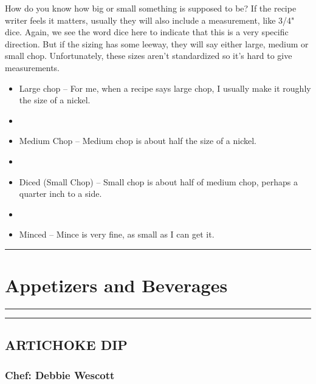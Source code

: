 \documentclass[
]{book}
\begin{document}
How do you know how big or small something is supposed to be? If the recipe writer feels it matters,
usually they will also include a measurement, like 3/4" dice.
Again, we see the word dice here to indicate that this is a very specific direction.
But if the sizing has some leeway, they will say either large, medium or small chop. Unfortunately,
these sizes aren't standardized so it's hard to give measurements.

\begin{itemize}
\item
  Large chop -- For me, when a recipe says large chop, I usually make it roughly the size of a nickel.
\item
\item
  Medium Chop -- Medium chop is about half the size of a nickel.
\item
\item
  Diced (Small Chop) -- Small chop is about half of medium chop, perhaps a quarter inch to a side.
\item
\item
  Minced -- Mince is very fine, as small as I can get it.
\end{itemize}

\begin{center}\rule{0.5\linewidth}{0.5pt}\end{center}

\hypertarget{appetizers}{%
\chapter{Appetizers and Beverages}\label{appetizers}}

\begin{center}\rule{0.5\linewidth}{0.5pt}\end{center}

\begin{center}\rule{0.5\linewidth}{0.5pt}\end{center}

\hypertarget{artichoke-dip}{%
\section*{ARTICHOKE DIP}\label{artichoke-dip}}


\hypertarget{chef-debbie-wescott}{%
\subsection*{Chef: Debbie Wescott}\label{chef-debbie-wescott}}
\end{document}

